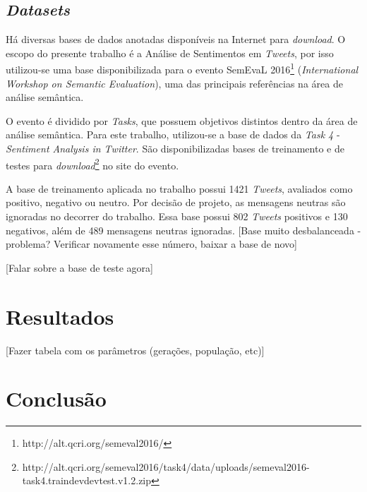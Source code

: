 \documentclass[12pt]{article}
\begin{document}
\subsection{\emph{Datasets}}

Há diversas bases de dados anotadas disponíveis na Internet para \emph{download}. O escopo do presente trabalho é a Análise de Sentimentos em \emph{Tweets}, por isso utilizou-se uma base disponibilizada para o evento SemEvaL 2016\footnote{http://alt.qcri.org/semeval2016/} (\emph{International Workshop on Semantic Evaluation}), uma das principais referências na área de análise semântica.  

O evento é dividido por \emph{Tasks}, que possuem objetivos distintos dentro da área de análise semântica. Para este trabalho, utilizou-se a base de dados da \emph{Task 4} - \emph{Sentiment Analysis in Twitter}. São disponibilizadas bases de treinamento e de testes para \emph{download}\footnote{http://alt.qcri.org/semeval2016/task4/data/uploads/semeval2016-task4.traindevdevtest.v1.2.zip} no site do evento.

A base de treinamento aplicada no trabalho possui 1421 \emph{Tweets}, avaliados como positivo, negativo ou neutro. Por decisão de projeto, as mensagens neutras são ignoradas no decorrer do trabalho. Essa base possui 802 \emph{Tweets} positivos e 130 negativos, além de 489 mensagens neutras ignoradas. [Base muito desbalanceada - problema? Verificar novamente esse número, baixar a base de novo]

[Falar sobre a base de teste agora]

\section{Resultados}

[Fazer tabela com os parâmetros (gerações, população, etc)]

\section{Conclusão}\label{conclusion}



\end{document}

